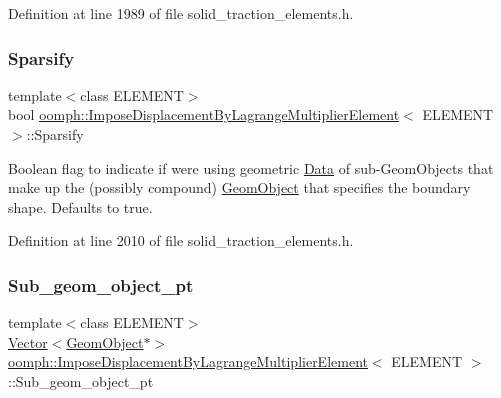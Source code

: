 Definition at line 1989 of file solid\+\_\+traction\+\_\+elements.\+h.

\mbox{\label{classoomph_1_1ImposeDisplacementByLagrangeMultiplierElement_ab8a7884a570a2ac0f3ea1f38642f26a7}} 
\subsubsection{\texorpdfstring{Sparsify}{Sparsify}}
{\footnotesize\ttfamily template$<$class E\+L\+E\+M\+E\+NT$>$ \\
bool \hyperlink{classoomph_1_1ImposeDisplacementByLagrangeMultiplierElement}{oomph\+::\+Impose\+Displacement\+By\+Lagrange\+Multiplier\+Element}$<$ E\+L\+E\+M\+E\+NT $>$\+::Sparsify\hspace{0.3cm}{\ttfamily [protected]}}



Boolean flag to indicate if we\textquotesingle{}re using geometric \hyperlink{classoomph_1_1Data}{Data} of sub-\/\+Geom\+Objects that make up the (possibly compound) \hyperlink{classoomph_1_1GeomObject}{Geom\+Object} that specifies the boundary shape. Defaults to true. 



Definition at line 2010 of file solid\+\_\+traction\+\_\+elements.\+h.

\mbox{\label{classoomph_1_1ImposeDisplacementByLagrangeMultiplierElement_a3049f33a38a6566d74e1201f890ddc75}} 
\subsubsection{\texorpdfstring{Sub\+\_\+geom\+\_\+object\+\_\+pt}{Sub\_geom\_object\_pt}}
{\footnotesize\ttfamily template$<$class E\+L\+E\+M\+E\+NT$>$ \\
\hyperlink{classoomph_1_1Vector}{Vector}$<$\hyperlink{classoomph_1_1GeomObject}{Geom\+Object}$\ast$$>$ \hyperlink{classoomph_1_1ImposeDisplacementByLagrangeMultiplierElement}{oomph\+::\+Impose\+Displacement\+By\+Lagrange\+Multiplier\+Element}$<$ E\+L\+E\+M\+E\+NT $>$\+::Sub\+\_\+geom\+\_\+object\+\_\+pt\hspace{0.3cm}{\ttfamily [protected]}}



